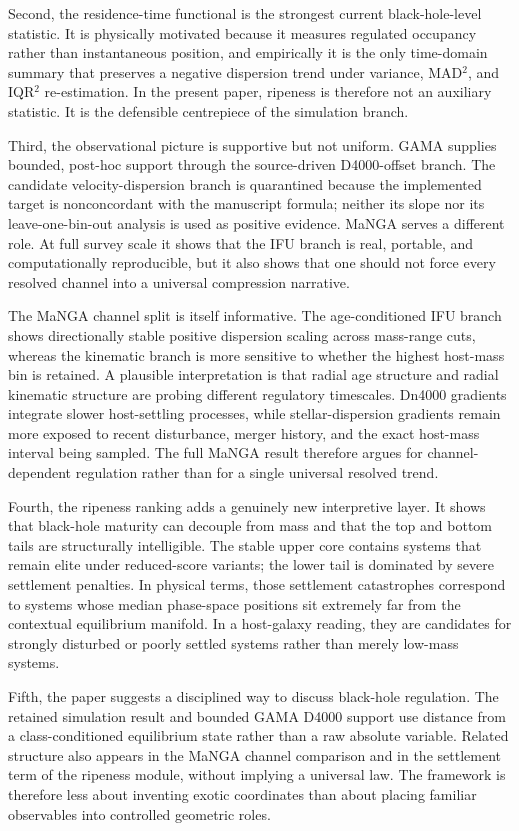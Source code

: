 \documentclass[11pt]{article}
\begin{document}
Second, the residence-time functional is the strongest current black-hole-level statistic. It is physically motivated because it measures regulated occupancy rather than instantaneous position, and empirically it is the only time-domain summary that preserves a negative dispersion trend under variance, MAD$^2$, and IQR$^2$ re-estimation. In the present paper, ripeness is therefore not an auxiliary statistic. It is the defensible centrepiece of the simulation branch.

Third, the observational picture is supportive but not uniform. GAMA supplies bounded, post-hoc support through the source-driven D4000-offset branch. The candidate velocity-dispersion branch is quarantined because the implemented target is nonconcordant with the manuscript formula; neither its slope nor its leave-one-bin-out analysis is used as positive evidence. MaNGA serves a different role. At full survey scale it shows that the IFU branch is real, portable, and computationally reproducible, but it also shows that one should not force every resolved channel into a universal compression narrative.

The MaNGA channel split is itself informative. The age-conditioned IFU branch shows directionally stable positive dispersion scaling across mass-range cuts, whereas the kinematic branch is more sensitive to whether the highest host-mass bin is retained. A plausible interpretation is that radial age structure and radial kinematic structure are probing different regulatory timescales. Dn4000 gradients integrate slower host-settling processes, while stellar-dispersion gradients remain more exposed to recent disturbance, merger history, and the exact host-mass interval being sampled. The full MaNGA result therefore argues for channel-dependent regulation rather than for a single universal resolved trend.

Fourth, the ripeness ranking adds a genuinely new interpretive layer. It shows that black-hole maturity can decouple from mass and that the top and bottom tails are structurally intelligible. The stable upper core contains systems that remain elite under reduced-score variants; the lower tail is dominated by severe settlement penalties. In physical terms, those settlement catastrophes correspond to systems whose median phase-space positions sit extremely far from the contextual equilibrium manifold. In a host-galaxy reading, they are candidates for strongly disturbed or poorly settled systems rather than merely low-mass systems.

Fifth, the paper suggests a disciplined way to discuss black-hole regulation. The retained simulation result and bounded GAMA D4000 support use distance from a class-conditioned equilibrium state rather than a raw absolute variable. Related structure also appears in the MaNGA channel comparison and in the settlement term of the ripeness module, without implying a universal law. The framework is therefore less about inventing exotic coordinates than about placing familiar observables into controlled geometric roles.
\end{document}
